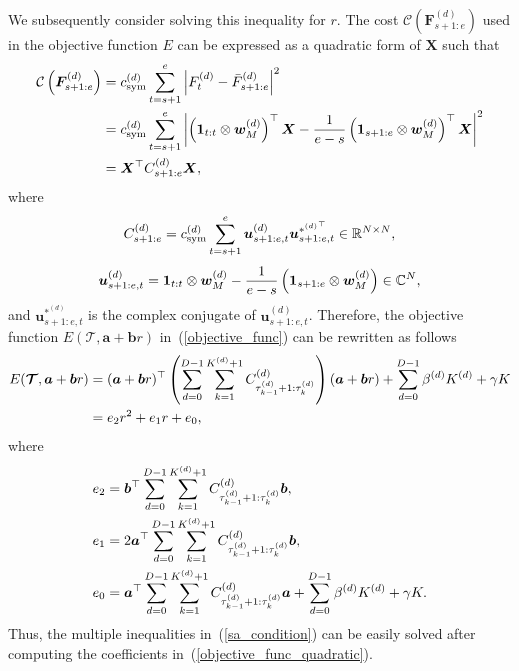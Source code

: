 We subsequently consider solving this inequality for $r$. 
The cost $\mathcal{C} \left(\bm{F}_{s+1:e}^{(d)}\right)$ used in the objective function $E$ can be expressed as a quadratic form of $\bm{X}$ such that 
\begin{align}
  \mathcal{C} \left(\bm{F}_{s+1:e}^{(d)}\right)
  &= c_{\text{sym}}^{(d)} \sum_{t=s+1}^e \left|F_t^{(d)} - \bar{F}_{s+1:e}^{(d)}\right|^2 \notag \\
  &= c_{\text{sym}}^{(d)} \sum_{t=s+1}^e \left|\left(\bm{1}_{t:t} \otimes \bm{w}_M^{(d)}\right)^\top \bm{X} - \frac{1}{e - s} \left(\bm{1}_{s+1:e} \otimes \bm{w}_M^{(d)}\right)^\top \bm{X} \right|^2 \notag \\
  &= \bm{X}^\top C^{(d)}_{s+1:e} \bm{X}, \notag 
\end{align}
where 
\begin{equation}
  C^{(d)}_{s+1:e} = c_{\text{sym}}^{(d)} \sum_{t=s+1}^e \bm{u}^{(d)}_{s+1:e, t} {\bm{u}_{s+1:e, t}^{{\ast^{(d)}}^\top}} \in \mathbb{R}^{N \times N}, \notag 
\end{equation}
\begin{equation}
\bm{u}^{(d)}_{s+1:e, t} = \bm{1}_{t:t} \otimes \bm{w}_M^{(d)} - \frac{1}{e - s} \left(\bm{1}_{s+1:e} \otimes \bm{w}_M^{(d)}\right) \in \mathbb{C}^N, \notag
\end{equation}
and $\bm{u}_{s+1:e, t}^{\ast^{(d)}}$ is the complex conjugate of $\bm{u}^{(d)}_{s+1:e, t}$. 
Therefore, the objective function $E(\bm{\mathcal{T}}, \bm{a} + \bm{b}r)$ in~(\ref{objective_func}) can be rewritten as follows 
\begin{align}
  E(\bm{\mathcal{T}}, \bm{a} + \bm{b}r) 
  &= (\bm{a} + \bm{b}r)^{\top} \left(\sum_{d=0}^{D-1} \sum_{k=1}^{K^{(d)}+1} C^{(d)}_{\tau_{k - 1}^{(d)}+1 : \tau_k^{(d)}}\right) (\bm{a} + \bm{b}r) + \sum_{d=0}^{D-1} \beta^{(d)} K^{(d)} + \gamma K \notag \\
  &= e_2 r^2 + e_1 r + e_0, \label{objective_func_quadratic}
\end{align}
where 
\begin{align}
  e_2 &= \bm{b}^{\top} \sum_{d=0}^{D-1} \sum_{k=1}^{K^{(d)}+1} C^{(d)}_{\tau_{k - 1}^{(d)}+1 : \tau_k^{(d)}} \bm{b}, \notag \\
  e_1 &= 2 \bm{a}^{\top} \sum_{d=0}^{D-1} \sum_{k=1}^{K^{(d)}+1} C^{(d)}_{\tau_{k - 1}^{(d)}+1 : \tau_k^{(d)}} \bm{b}, \notag \\
  e_0 &= \bm{a}^{\top} \sum_{d=0}^{D-1} \sum_{k=1}^{K^{(d)}+1} C^{(d)}_{\tau_{k - 1}^{(d)}+1 : \tau_k^{(d)}} \bm{a} + \sum_{d=0}^{D-1} \beta^{(d)} K^{(d)} + \gamma K. \notag
\end{align}
Thus, the multiple inequalities in~(\ref{sa_condition}) can be easily solved after computing the coefficients in~(\ref{objective_func_quadratic}).

